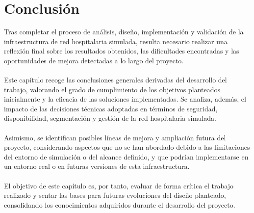 
\chapter{Conclusión}\label{conclusion}
Tras completar el proceso de análisis, diseño, implementación y validación de la infraestructura de red hospitalaria simulada, resulta necesario realizar una reflexión final 
sobre los resultados obtenidos, las dificultades encontradas y las oportunidades de mejora detectadas a lo largo del proyecto.
\\ \\
Este capítulo recoge las conclusiones generales derivadas del desarrollo del trabajo, valorando el grado de cumplimiento de los objetivos planteados inicialmente y la 
eficacia de las soluciones implementadas. Se analiza, además, el impacto de las decisiones técnicas adoptadas en términos de seguridad, disponibilidad, segmentación y gestión 
de la red hospitalaria simulada.
\\ \\
Asimismo, se identifican posibles líneas de mejora y ampliación futura del proyecto, considerando aspectos que no se han abordado debido a las limitaciones del entorno de 
simulación o del alcance definido, y que podrían implementarse en un entorno real o en futuras versiones de esta infraestructura.
\\ \\
El objetivo de este capítulo es, por tanto, evaluar de forma crítica el trabajo realizado y sentar las bases para futuras evoluciones del diseño planteado, consolidando los 
conocimientos adquiridos durante el desarrollo del proyecto.


